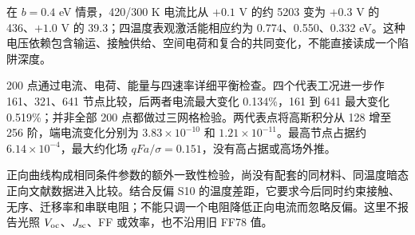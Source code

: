 {\cjkfont 在}\allowbreak{} $b=0.4$ eV {\cjkfont 情景，}\allowbreak{}420/300 K {\cjkfont 电流比从}\allowbreak{} $+0.1$ V {\cjkfont 的约}\allowbreak{} 5203 {\cjkfont 变为}\allowbreak{} $+0.3$ V {\cjkfont 的}\allowbreak{} 436{\cjkfont 、}\allowbreak{}$+1.0$ V {\cjkfont 的}\allowbreak{} 39.3{\cjkfont ；四温度表观激活能相应约为}\allowbreak{} 0.774{\cjkfont 、}\allowbreak{}0.550{\cjkfont 、}\allowbreak{}0.332 eV{\cjkfont 。这种电压依赖包含输运、接触供给、空间电荷和复合的共同变化，不能直接读成一个陷阱深度。}\allowbreak{}

200 {\cjkfont 点通过电流、电荷、能量与四速率详细平衡检查。四个代表工况进一步作}\allowbreak{} 161{\cjkfont 、}\allowbreak{}321{\cjkfont 、}\allowbreak{}641 {\cjkfont 节点比较，后两者电流最大变化}\allowbreak{} 0.134\%{\cjkfont ，}\allowbreak{}161 {\cjkfont 到}\allowbreak{} 641 {\cjkfont 最大变化}\allowbreak{} 0.519\%{\cjkfont ；并非全部}\allowbreak{} 200 {\cjkfont 点都做过三网格检验。两代表点将高斯积分从}\allowbreak{} 128 {\cjkfont 增至}\allowbreak{} 256 {\cjkfont 阶，端电流变化分别为}\allowbreak{} $3.83\times10^{-10}$ {\cjkfont 和}\allowbreak{} $1.21\times10^{-11}${\cjkfont 。最高节点占据约}\allowbreak{} $6.14\times10^{-4}${\cjkfont ，最大约化场}\allowbreak{} $qFa/\sigma=0.151${\cjkfont ，没有高占据或高场外推。}\allowbreak{}

{\cjkfont 正向曲线构成相同条件参数的额外一致性检验，尚没有配套的同材料、同温度暗态正向文献数据进入比较。结合反偏}\allowbreak{} S10 {\cjkfont 的温度差距，它要求今后同时约束接触、无序、迁移率和串联电阻；不能只调一个电阻降低正向电流而忽略反偏。这里不报告光照}\allowbreak{} $V_{\rm oc}${\cjkfont 、}\allowbreak{}$J_{\rm sc}${\cjkfont 、}\allowbreak{}FF {\cjkfont 或效率，也不沿用旧}\allowbreak{} FF78 {\cjkfont 值。}\allowbreak{}

